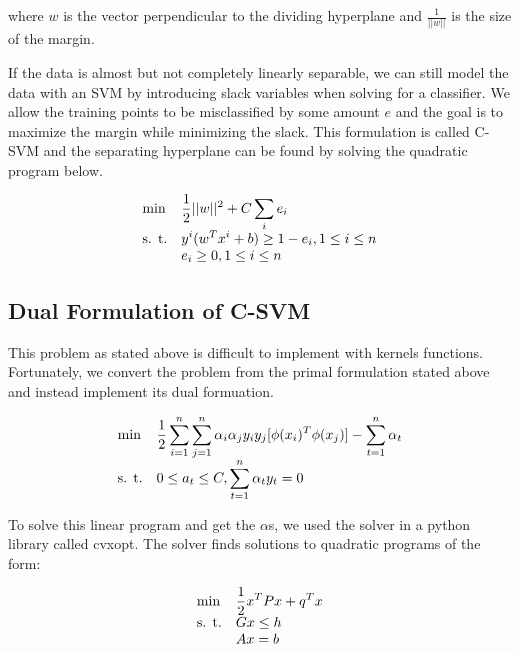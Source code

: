 \documentclass[10pt,twoside]{article}
\begin{document}
where $w$ is the vector perpendicular to the dividing hyperplane and $\frac{1}{||w||}$ is the size of the margin.

If the data is almost but not completely linearly separable, we can still model the data with an SVM by introducing slack variables when solving for a classifier. We allow the training points to be misclassified by some amount $e$ and the goal is to maximize the margin while minimizing the slack. This formulation is called C-SVM and the separating hyperplane can be found by solving the quadratic program below.

\begin{equation}
\begin{array}{ll@{}ll}
\text{min}  & \displaystyle \frac{1}{2} ||w||^2 + C \sum_i e_i &\\
\text{s. t.}& \displaystyle y^i(w^T x^i + b) \geq 1 - e_i , 1 \leq i \leq n \\
& e_i \geq 0 , 1 \leq i \leq n
\end{array}
\end{equation}

\subsection{Dual Formulation of C-SVM}
This problem as stated above is difficult to implement with kernels functions. Fortunately, we convert the problem from the primal formulation stated above and instead implement its dual formuation.

\begin{equation}
\begin{array}{ll@{}ll}
\text{min}  & \displaystyle \frac{1}{2} \sum_{i=1}^{n} \sum_{j=1}^n \alpha_i \alpha_j y_i y_j [\phi(x_i)^T \phi(x_j)] - \sum_{t=1}^{n} \alpha_t &\\
\text{s. t.}& \displaystyle 0 \leq a_t \leq C , \sum_{t=1}^{n} \alpha_t y_t = 0
\end{array}
\end{equation}

To solve this linear program and get the $\alpha$s, we used the solver in a python library called cvxopt. The solver finds solutions to quadratic programs of the form:

\begin{equation}
\begin{array}{ll@{}ll}
\text{min}  & \displaystyle \frac{1}{2} x^T P x + q^T x &\\
\text{s. t.}& \displaystyle G x \leq h &\\
& Ax = b
\end{array}
\end{equation}
\end{document}
